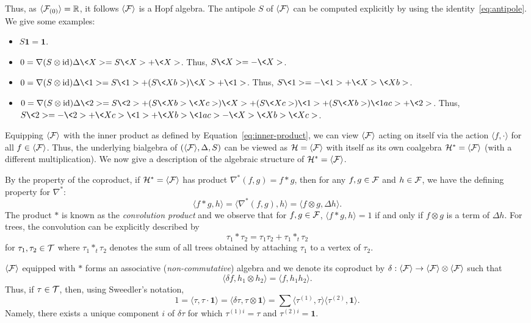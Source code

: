 \documentclass[11pt]{style/preprint}
\begin{document}
Thus, as \(\langle {\mathcal F}_{(0)}\rangle = \mathbb{R}\), it follows \(\langle {\mathcal F}\rangle\) is a Hopf algebra.
The antipole \(S\) of \(\langle {\mathcal F}\rangle\) can be computed explicitly by using the identity~\eqref{eq:antipole}. 
We give some examples:
\begin{itemize}
  \item \(S \mathbf{1} = \mathbf{1}\).
  \item \(0 = \nabla (S \otimes \text{id}) \Delta \<X> = S \<X> + \<X>\). Thus, \(S \<X> = -\<X>\).
  \item \(0 = \nabla (S \otimes \text{id}) \Delta \<1> = S \<1> + (S \<Xb>) \<X> + \<1>\). 
    Thus, \(S \<1> = -\<1> + \<X> \<Xb>\).
  \item \(0 = \nabla (S \otimes \text{id}) \Delta \<2> = S \<2> + (S \<Xb> \<Xc>) \<X> + (S \<Xc>) \<1> + (S \<Xb>) \<1ac> + \<2>\).
    Thus, \(S \<2> = -\<2> + \<Xc> \<1> + \<Xb> \<1ac> - \<X> \<Xb> \<Xc>\).
\end{itemize}

Equipping \(\langle {\mathcal F} \rangle\) with the inner product as defined by Equation~\eqref{eq:inner-product}, 
we can view \(\langle {\mathcal F} \rangle\) acting on itself via the action \(\langle f, \cdot \rangle\) 
for all \(f \in \langle {\mathcal F} \rangle\). Thus, the underlying bialgebra of \((\langle {\mathcal F} \rangle, \Delta, S)\) 
can be viewed as \({\mathcal H} = \langle {\mathcal F} \rangle\) with itself as its own coalgebra \({\mathcal H}^* = \langle {\mathcal F} \rangle\) 
(with a different multiplication). We now give a description of the algebraic structure of 
\({\mathcal H}^* = \langle {\mathcal F} \rangle\).

By the property of the coproduct, if \({\mathcal H}^* = \langle {\mathcal F} \rangle\) has product \(\nabla^*(f, g) = f * g\), then
for any \(f, g \in {\mathcal F}\) and \(h \in {\mathcal F}\), we have the defining property for \(\nabla^*\):
\[\langle f * g, h\rangle = \langle \nabla^*(f, g), h\rangle = \langle f \otimes g, \Delta h\rangle.\]
The product \(*\) is known as the \textit{convolution product} and we observe that for \(f, g \in {\mathcal F}\), 
\(\langle f * g, h\rangle = 1\) if and only if \(f \otimes g\) is a term of \(\Delta h\). For trees, the 
convolution can be explicitly described by
\[\tau_1 * \tau_2 = \tau_1 \tau_2 + \tau_1 *_t \tau_2\]
for \(\tau_1, \tau_2 \in {\mathcal T}\) where \(\tau_1 *_t \tau_2\) denotes the sum of all trees obtained 
by attaching \(\tau_1\) to a vertex of \(\tau_2\).

\(\langle {\mathcal F} \rangle\) equipped with \(*\) forms an associative (\textit{non-commutative}) algebra 
and we denote its coproduct by \(\delta :  \langle {\mathcal F} \rangle \to  \langle {\mathcal F} \rangle \otimes  \langle {\mathcal F} \rangle\) 
such that 
\[\langle \delta f, h_1 \otimes h_2\rangle = \langle f, h_1 h_2\rangle.\]
Thus, if \(\tau \in {\mathcal T}\), then, using Sweedler's notation,
\[1 = \langle \tau, \tau \cdot \mathbf{1}\rangle = \langle \delta \tau, \tau \otimes \mathbf{1}\rangle
  = \sum \langle \tau^{(1)}, \tau\rangle \langle \tau^{(2)}, \mathbf{1}\rangle.\]
Namely, there exists a unique component \(i\) of \(\delta \tau\) for which \(\tau^{(1)i} = \tau\) and 
\(\tau^{(2)i} = \mathbf{1}\).
\end{document}
